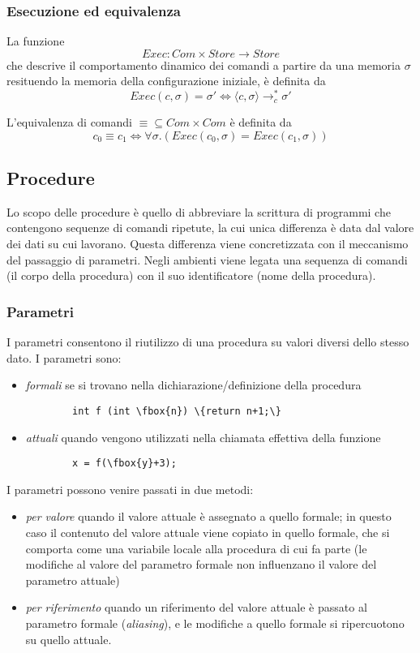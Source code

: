 \documentclass[a4paper, 10pt]{article}
\begin{document}
	\subsubsection{Esecuzione ed equivalenza}
	La funzione 
	\[
	Exec:Com\times Store \to Store
	\]
	che descrive il comportamento dinamico dei comandi a partire da una memoria $\sigma$ resituendo la memoria della configurazione iniziale, è definita da 
	\[
	Exec(c, \sigma)=\sigma' \iff \langle c, \sigma \rangle \to_c^* \sigma'
	\]
	
	L'equivalenza di comandi $\equiv \subseteq Com \times Com$ è definita da 
	\[
	c_0 \equiv c_1 \iff \forall \sigma.(Exec(c_0, \sigma)=Exec(c_1, \sigma))
	\]
	
	\subsection{Procedure}
	Lo scopo delle procedure è quello di abbreviare la scrittura di programmi che contengono sequenze di comandi ripetute, la cui unica differenza è data dal valore dei dati su cui lavorano. Questa differenza viene concretizzata con il meccanismo del passaggio di parametri. Negli ambienti viene legata una sequenza di comandi (il corpo della procedura) con il suo identificatore (nome della procedura).
	
	\subsubsection{Parametri}
	I parametri consentono il riutilizzo di una procedura su valori diversi dello stesso dato.
	I parametri sono:
	\begin{itemize}
		\item \textit{formali} se si trovano nella dichiarazione/definizione della procedura \\
		\begin{BVerbatim}
		int f (int \fbox{n}) \{return n+1;\}
		\end{BVerbatim}
		\item \textit{attuali} quando vengono utilizzati nella chiamata effettiva della funzione \\
		\begin{BVerbatim}
		x = f(\fbox{y}+3);
		\end{BVerbatim}
	\end{itemize}
	
	I parametri possono venire passati in due metodi:
	\begin{itemize}
		\item \textit{per valore} quando il valore attuale è assegnato a quello formale; in questo caso il contenuto del valore attuale viene copiato in quello formale, che si comporta come una variabile locale alla procedura di cui fa parte (le modifiche al valore del parametro formale non influenzano il valore del parametro attuale)
		
		\item \textit{per riferimento} quando un riferimento del valore attuale è passato al parametro formale (\textit{aliasing}), e le modifiche a quello formale si ripercuotono su quello attuale.
	\end{itemize}
	
\end{document}
